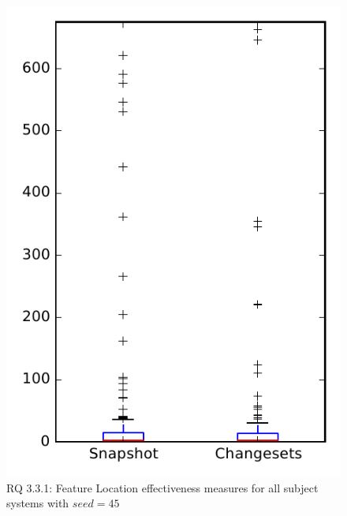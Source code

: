 
\begin{figure}
\centering
\includegraphics[height=0.4\textheight]{figures/flt_seed/rq1_overview_45}
\caption{RQ 3.3.1: Feature Location effectiveness measures for all subject systems with $seed=45$}
\label{fig:flt_seed:rq1:overview}
\end{figure}
